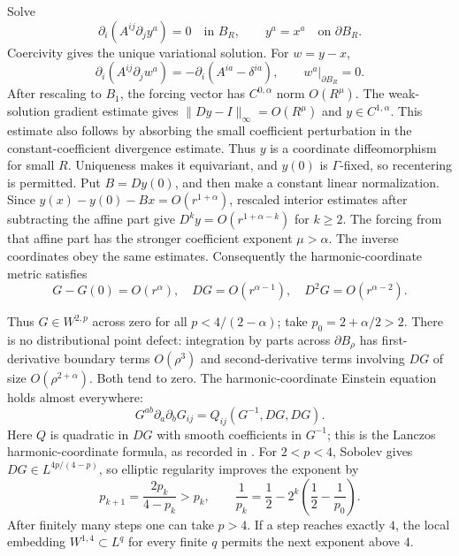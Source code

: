 Solve
\[
 \partial_i(A^{ij}\partial_jy^a)=0\quad\text{in }B_R,\qquad
 y^a=x^a\quad\text{on }\partial B_R.
\]
Coercivity gives the unique variational solution. For $w=y-x$,
\[
 \partial_i(A^{ij}\partial_jw^a)
       =-\partial_i(A^{ia}-\delta^{ia}),\qquad
 w^a|_{\partial B_R}=0.
\]
After rescaling to $B_1$, the forcing vector has
$C^{0,\alpha}$ norm $O(R^\mu)$. The weak-solution gradient estimate
\cite[Theorem~8.16 and Corollary~8.35]{GilbargTrudinger2001} gives
$\|Dy-I\|_\infty=O(R^\mu)$ and $y\in C^{1,\alpha}$. This estimate
also follows by absorbing the small coefficient perturbation in the
constant-coefficient divergence estimate. Thus $y$ is a coordinate
diffeomorphism for small $R$. Uniqueness makes it equivariant, and
$y(0)$ is $\Gamma$-fixed, so recentering is permitted. Put $B=Dy(0)$,
and then make a constant linear normalization. Since
$y(x)-y(0)-Bx=O(r^{1+\alpha})$, rescaled interior estimates after
subtracting the affine part give
$D^ky=O(r^{1+\alpha-k})$ for $k\geq2$. The forcing from that affine
part has the stronger coefficient exponent $\mu>\alpha$.
The inverse coordinates obey the same estimates. Consequently the
harmonic-coordinate metric satisfies
\begin{equation}\label{geom:harmonic-decay}
 G-G(0)=O(r^\alpha),\quad DG=O(r^{\alpha-1}),\quad
 D^2G=O(r^{\alpha-2}).
\end{equation}

Thus $G\in W^{2,p}$ across zero for all $p<4/(2-\alpha)$; take
$p_0=2+\alpha/2>2$. There is no distributional point defect:
integration by parts across $\partial B_\rho$ has first-derivative
boundary terms $O(\rho^3)$ and second-derivative terms involving
$DG$ of size $O(\rho^{2+\alpha})$. Both tend to zero.
The harmonic-coordinate Einstein equation holds almost everywhere:
\begin{equation}\label{geom:weak-einstein}
 G^{ab}\partial_a\partial_bG_{ij}=Q_{ij}(G^{-1},DG,DG).
\end{equation}
Here $Q$ is quadratic in $DG$ with smooth coefficients in $G^{-1}$;
this is the Lanczos harmonic-coordinate formula, as recorded in
\cite[Lemma~4.1, equation~(4.3)]{DeTurckKazdan1981}. For $2<p<4$, Sobolev gives
$DG\in L^{4p/(4-p)}$, so elliptic regularity improves the exponent by
\begin{equation}\label{geom:bootstrap-exponents}
 p_{k+1}=\frac{2p_k}{4-p_k}>p_k,\qquad
 \frac1{p_k}=\frac12-2^k\left(\frac12-\frac1{p_0}\right).
\end{equation}
After finitely many steps one can take $p>4$. If a step reaches
exactly $4$, the local embedding $W^{1,4}\subset L^q$ for every
finite $q$ permits the next exponent above $4$.

